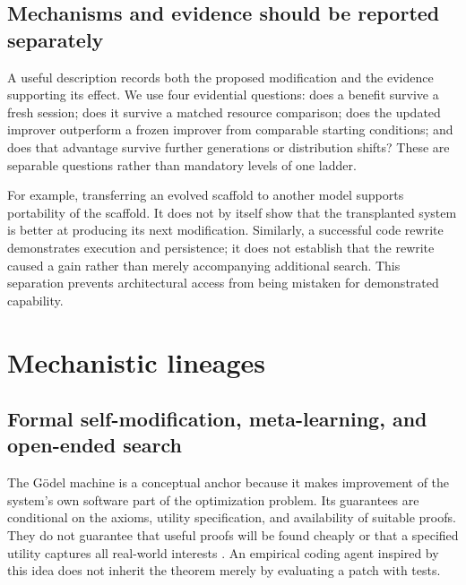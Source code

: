 \documentclass[11pt,american,]{article}
\begin{document}
\hypertarget{mechanisms-and-evidence-should-be-reported-separately}{%
\subsection{Mechanisms and evidence should be reported
separately}\label{mechanisms-and-evidence-should-be-reported-separately}}

A useful description records both the proposed modification and the
evidence supporting its effect. We use four evidential questions: does a
benefit survive a fresh session; does it survive a matched resource
comparison; does the updated improver outperform a frozen improver from
comparable starting conditions; and does that advantage survive further
generations or distribution shifts? These are separable questions rather
than mandatory levels of one ladder.

For example, transferring an evolved scaffold to another model supports
portability of the scaffold. It does not by itself show that the
transplanted system is better at producing its next modification.
Similarly, a successful code rewrite demonstrates execution and
persistence; it does not establish that the rewrite caused a gain rather
than merely accompanying additional search. This separation prevents
architectural access from being mistaken for demonstrated capability.

\hypertarget{mechanistic-lineages}{%
\section{Mechanistic lineages}\label{mechanistic-lineages}}

\hypertarget{formal-self-modification-meta-learning-and-open-ended-search}{%
\subsection{Formal self-modification, meta-learning, and open-ended
search}\label{formal-self-modification-meta-learning-and-open-ended-search}}

The Gödel machine is a conceptual anchor because it makes improvement of
the system's own software part of the optimization problem. Its
guarantees are conditional on the axioms, utility specification, and
availability of suitable proofs. They do not guarantee that useful
proofs will be found cheaply or that a specified utility captures all
real-world interests \citep{goedel2003}. An empirical coding agent
inspired by this idea does not inherit the theorem merely by evaluating
a patch with tests.
\end{document}
